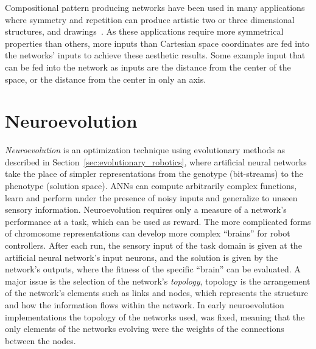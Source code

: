 Compositional pattern producing networks have been used in many applications where symmetry and repetition can produce artistic two or three dimensional structures\cite{endlessforms}, and drawings~\cite{secretan2008picbreeder,picbreederSite}. As these applications require more symmetrical properties than others, more inputs than Cartesian space coordinates are fed into the networks' inputs to achieve these  aesthetic results. Some example input that can be fed into the network as inputs are the distance from the center of the space, or the distance from the center in only an axis.



\section{Neuroevolution}



\emph{Neuroevolution} is an optimization technique using evolutionary methods as described in Section~\ref{sec:evolutionary_robotics}, where artificial neural networks take the place of simpler representations from the genotype (bit-streams) to the phenotype (solution space). ANNs can compute arbitrarily complex functions, learn and perform under the presence of noisy inputs and generalize to unseen sensory information. Neuroevolution requires only a measure of a network's performance at a task, which can be used as reward. The more complicated forms of chromosome representations can develop more complex ``brains'' for robot controllers. After each run, the sensory input of the task domain is given at the artificial neural network's input neurons, and the solution is given by the network's outputs, where the fitness of the specific ``brain'' can be evaluated. A major issue is the selection of the network's \emph{topology}, topology is the arrangement of the network's elements such as links and nodes, which represents the structure and how the information flows within the network. In early neuroevolution implementations the topology of the networks used, was fixed, meaning that the only elements of the networks evolving were the weights of the connections between the nodes.

